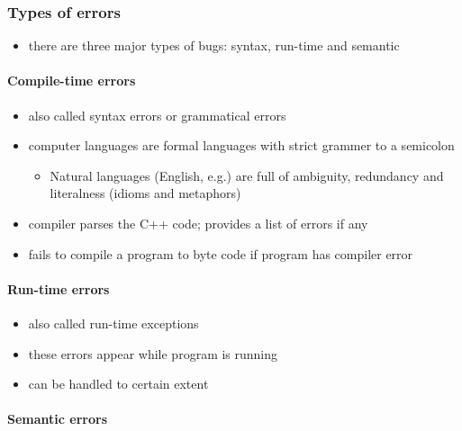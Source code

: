 \documentclass[11pt]{article}
\providecommand{\tightlist}{%
      \setlength{\itemsep}{0pt}\setlength{\parskip}{0pt}}
\begin{document}
\hypertarget{types-of-errors}{%
\subsubsection{Types of errors}\label{types-of-errors}}

\begin{itemize}
\tightlist
\item
  there are three major types of bugs: syntax, run-time and semantic
\end{itemize}

\hypertarget{compile-time-errors}{%
\paragraph{Compile-time errors}\label{compile-time-errors}}

\begin{itemize}
\tightlist
\item
  also called syntax errors or grammatical errors
\item
  computer languages are formal languages with strict grammer to a
  semicolon

  \begin{itemize}
  \tightlist
  \item
    Natural languages (English, e.g.) are full of ambiguity, redundancy
    and literalness (idioms and metaphors)
  \end{itemize}
\item
  compiler parses the C++ code; provides a list of errors if any
\item
  fails to compile a program to byte code if program has compiler error
\end{itemize}

\hypertarget{run-time-errors}{%
\paragraph{Run-time errors}\label{run-time-errors}}

\begin{itemize}
\tightlist
\item
  also called run-time exceptions
\item
  these errors appear while program is running
\item
  can be handled to certain extent
\end{itemize}

\hypertarget{semantic-errors}{%
\paragraph{Semantic errors}\label{semantic-errors}}
\end{document}
